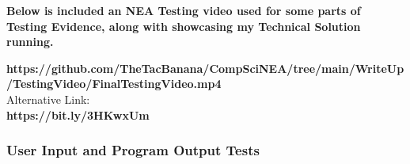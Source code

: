 \vspace{1cm}

\begin{center}
    \large
    \textbf{Below is included an NEA Testing video used for some parts of Testing Evidence, along with showcasing my Technical Solution running.}
    
    \vspace{0.2cm}
    
    \Large
    \textbf{https://github.com/TheTacBanana/CompSciNEA/tree/main/WriteUp/TestingVideo/FinalTestingVideo.mp4} \\
    {\large Alternative Link:} \\
    \textbf{https://bit.ly/3HKwxUm}
\end{center}

\pagebreak

\vspace{1cm}
\subsubsection{User Input and Program Output Tests}
\vspace{0.5cm}

